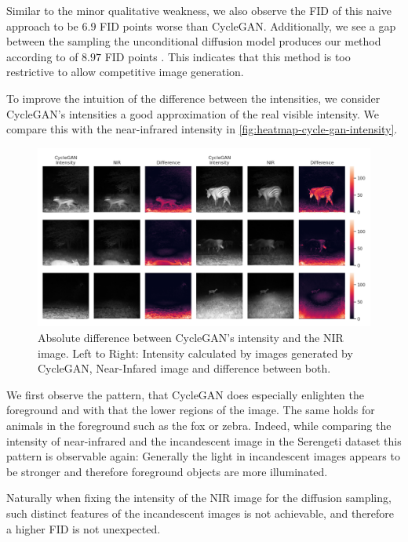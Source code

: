 Similar to the minor qualitative weakness, we also observe the FID of this naive approach to be $6.9$ FID points worse than CycleGAN.
Additionally, we see a gap between the sampling the unconditional diffusion model produces our method according to  of $8.97$ FID points \parencite{sbgm}.
This indicates that this method is too restrictive to allow competitive image generation.

To improve the intuition of the difference between the intensities, we consider CycleGAN's intensities a good approximation of the real visible intensity.
We compare this with the near-infrared intensity in \autoref{fig:heatmap-cycle-gan-intensity}.

\begin{figure}[htp!]
    \centering
    \includegraphics[width=\textwidth]{gfx/heatmap-nir-cycle-gan-intensity-diff.png}
    \caption{
        Absolute difference between CycleGAN's intensity and the NIR image.
        Left to Right: Intensity calculated by images generated by CycleGAN, Near-Infared image \parencite{serengeti} and difference between both.
    }
    \label{fig:heatmap-cycle-gan-intensity}
\end{figure}

We first observe the pattern, that CycleGAN does especially enlighten the foreground and with that the lower regions of the image.
The same holds for animals in the foreground such as the fox or zebra.
Indeed, while comparing the intensity of near-infrared and the incandescent image in the Serengeti dataset \parencite{serengeti}
this pattern is observable again:
Generally the light in incandescent images appears to be stronger and therefore foreground objects are more illuminated.

Naturally when fixing the intensity of the NIR image for the diffusion sampling, such distinct features of the incandescent images is not achievable,
and therefore a higher FID is not unexpected.

